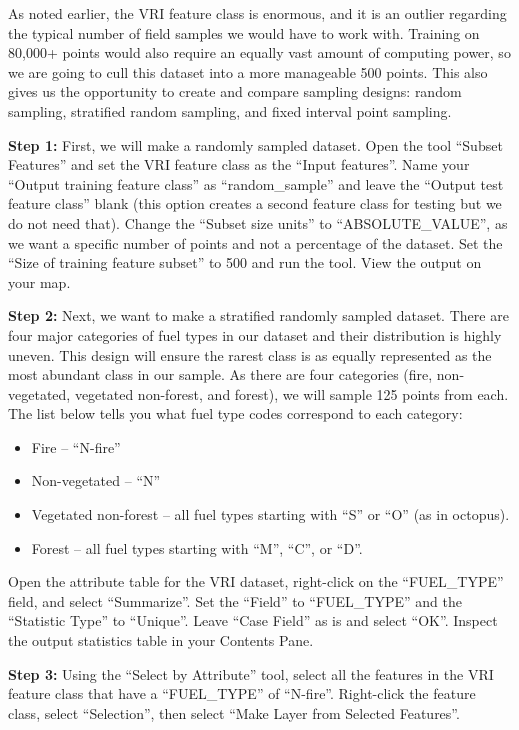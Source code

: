 \documentclass[
]{book}
\providecommand{\tightlist}{%
  \setlength{\itemsep}{0pt}\setlength{\parskip}{0pt}}
\begin{document}
As noted earlier, the VRI feature class is enormous, and it is an outlier regarding the typical number of field samples we would have to work with. Training on 80,000+ points would also require an equally vast amount of computing power, so we are going to cull this dataset into a more manageable 500 points. This also gives us the opportunity to create and compare sampling designs: random sampling, stratified random sampling, and fixed interval point sampling.

\textbf{Step 1:} First, we will make a randomly sampled dataset. Open the tool ``Subset Features'' and set the VRI feature class as the ``Input features''. Name your ``Output training feature class'' as ``random\_sample'' and leave the ``Output test feature class'' blank (this option creates a second feature class for testing but we do not need that). Change the ``Subset size units'' to ``ABSOLUTE\_VALUE'', as we want a specific number of points and not a percentage of the dataset. Set the ``Size of training feature subset'' to 500 and run the tool. View the output on your map.

\textbf{Step 2:} Next, we want to make a stratified randomly sampled dataset. There are four major categories of fuel types in our dataset and their distribution is highly uneven. This design will ensure the rarest class is as equally represented as the most abundant class in our sample. As there are four categories (fire, non-vegetated, vegetated non-forest, and forest), we will sample 125 points from each. The list below tells you what fuel type codes correspond to each category:

\begin{itemize}
\tightlist
\item
  Fire -- ``N-fire''
\item
  Non-vegetated -- ``N''
\item
  Vegetated non-forest -- all fuel types starting with ``S'' or ``O'' (as in octopus).
\item
  Forest -- all fuel types starting with ``M'', ``C'', or ``D''.
\end{itemize}

Open the attribute table for the VRI dataset, right-click on the ``FUEL\_TYPE'' field, and select ``Summarize''. Set the ``Field'' to ``FUEL\_TYPE'' and the ``Statistic Type'' to ``Unique''. Leave ``Case Field'' as is and select ``OK''. Inspect the output statistics table in your Contents Pane.

\textbf{Step 3:} Using the ``Select by Attribute'' tool, select all the features in the VRI feature class that have a ``FUEL\_TYPE'' of ``N-fire''. Right-click the feature class, select ``Selection'', then select ``Make Layer from Selected Features''.
\end{document}
